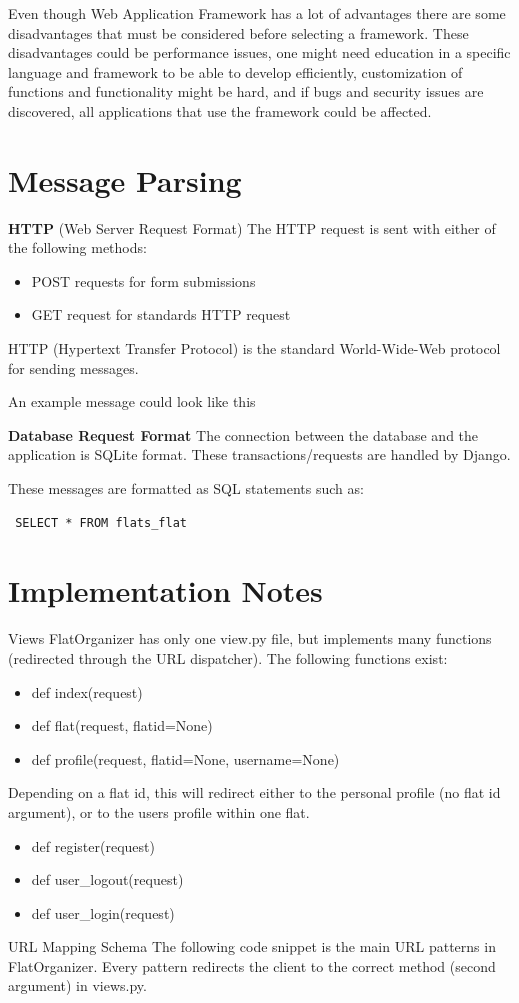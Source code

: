 \documentclass{sig-alt-release2}
\begin{document}
Even though Web Application Framework has a lot of advantages there are some disadvantages that must be considered before selecting a framework. These disadvantages could be performance issues, one might need education in a specific language and framework to be able to develop efficiently, customization of functions and functionality might be hard, and if bugs and security issues are discovered, all applications that use the framework could be affected. \cite{x11}

\section{Message Parsing}

\textbf{HTTP} (Web Server Request Format)
The HTTP request is sent with either of the following methods:
\begin{itemize}
\item POST requests for form submissions
\item GET request for standards HTTP request
\end{itemize}
HTTP (Hypertext Transfer Protocol) is the standard World-Wide-Web protocol for sending messages.

An example message could look like this

 
\textbf{Database Request Format}
The connection between the database and the application is SQLite format. These transactions/requests are handled by Django.

These messages are formatted as SQL statements such as: 
\begin{verbatim} SELECT * FROM flats_flat \end{verbatim}



\section{Implementation Notes}

Views
FlatOrganizer has only one view.py file, but implements many functions (redirected through the URL dispatcher). The following functions exist:

\begin{itemize}
\item def index(request)
\item def flat(request, flatid=None)
\item def profile(request, flatid=None, username=None)
\end{itemize}
Depending on a flat id, this will redirect either to the personal profile (no flat id argument), or to the users profile within one flat.
\begin{itemize}
\item def register(request)
\item def user{\_}logout(request)
\item def user{\_}login(request)
\end{itemize}
URL Mapping Schema
The following code snippet is the main URL patterns in FlatOrganizer. Every pattern redirects the client to the correct method (second argument) in views.py.
\end{document}
